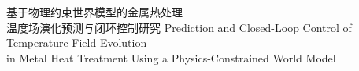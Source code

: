 \thesisTitle
{基于物理约束世界模型的金属热处理\\温度场演化预测与闭环控制研究}
{Prediction and Closed-Loop Control of Temperature-Field Evolution\\in Metal Heat Treatment Using a Physics-Constrained World Model}



\integrityStatementAuthor{}
\integrityStatementDate{}{}{}

\translationRef{}

